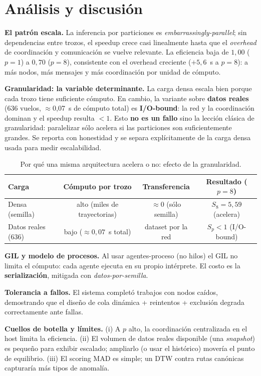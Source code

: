 \documentclass[letterpaper,11pt]{article}
\begin{document}
\section{Análisis y discusión}
\textbf{El patrón escala.} La inferencia por particiones es \emph{embarrassingly-parallel}; sin
dependencias entre trozos, el speedup crece casi linealmente hasta que el \emph{overhead} de coordinación
y comunicación se vuelve relevante. La eficiencia baja de $1{,}00$ ($p{=}1$) a $0{,}70$ ($p{=}8$),
consistente con el overhead creciente ($+5{,}6$~s a $p{=}8$): a más nodos, más mensajes y más coordinación
por unidad de cómputo.

\textbf{Granularidad: la variable determinante.} La carga densa escala bien porque cada trozo tiene
suficiente cómputo. En cambio, la variante sobre \textbf{datos reales} (636 vuelos, $\approx$0{,}07~s de
cómputo total) es \textbf{I/O-bound}: la red y la coordinación dominan y el speedup resulta $<1$. Esto
\textbf{no es un fallo} sino la lección clásica de granularidad: paralelizar sólo acelera si las
particiones son suficientemente grandes. Se reporta con honestidad y se separa explícitamente de la
carga densa usada para medir escalabilidad.

\begin{table}[H]\centering\small
\caption{Por qué una misma arquitectura acelera o no: efecto de la granularidad.}
\label{tab:gran}
\begin{tabular}{lccc}
\toprule
Carga & Cómputo por trozo & Transferencia & Resultado ($p{=}8$) \\
\midrule
Densa (semilla) & alto (miles de trayectorias) & $\approx 0$ (sólo semilla) & $S_8=5{,}59$ (acelera) \\
Datos reales (636) & bajo ($\approx 0{,}07$~s total) & dataset por la red & $S_p<1$ (I/O-bound) \\
\bottomrule
\end{tabular}
\end{table}

\textbf{GIL y modelo de procesos.} Al usar agentes-proceso (no hilos) el GIL no limita el cómputo: cada
agente ejecuta en su propio intérprete. El costo es la \textbf{serialización}, mitigada con
\emph{datos-por-semilla}.

\textbf{Tolerancia a fallos.} El sistema completó trabajos con nodos caídos, demostrando que el diseño de
cola dinámica + reintentos + exclusión degrada correctamente ante fallas.

\textbf{Cuellos de botella y límites.} (i) A $p$ alto, la coordinación centralizada en el host limita la
eficiencia. (ii) El volumen de datos reales disponible (una \emph{snapshot}) es pequeño para exhibir
escalado; ampliarlo (o usar el histórico) movería el punto de equilibrio. (iii) El scoring MAD es simple;
un DTW contra rutas canónicas capturaría más tipos de anomalía.
\end{document}

